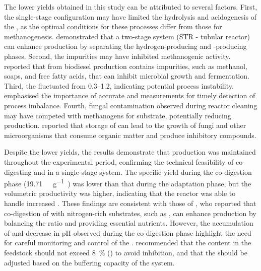 The lower  yields obtained in this study can be attributed to several factors. First, the single-stage configuration may have limited the hydrolysis and acidogenesis of the , as the optimal conditions for these processes differ from those for methanogenesis. \textcite{srimachai2025} demonstrated that a two-stage system (STR - tubular reactor) can enhance  production by separating the hydrogen-producing and -producing phases. Second, the  impurities may have inhibited methanogenic activity. \textcite{anand2012} reported that  from biodiesel production contains impurities, such as methanol, soaps, and free fatty acids, that can inhibit microbial growth and fermentation. Third, the  fluctuated from \numrange{0.3}{1.2}, indicating potential process instability. \textcite{ribas2007} emphasised the importance of accurate  and  measurements for timely detection of process imbalance. Fourth, fungal contamination observed during reactor cleaning may have competed with methanogens for substrate, potentially reducing  production. \textcite{degueurce2020} reported that storage of  can lead to the growth of fungi and other microorganisms that consume organic matter and produce inhibitory compounds.

Despite the lower yields, the results demonstrate that  production was maintained throughout the experimental period, confirming the technical feasibility of co-digesting  and  in a single-stage system. The specific  yield during the co-digestion phase (\qty{19.71}{\nml\CH\per\gram\VSfed}) was lower than that during the adaptation phase, but the volumetric productivity was higher, indicating that the reactor was able to handle increased . These findings are consistent with those of \textcite{gebreegziabher2025}, who reported that co-digestion of  with nitrogen-rich substrates, such as , can enhance  production by balancing the  ratio and providing essential nutrients. However, the accumulation of  and decrease in pH observed during the co-digestion phase highlight the need for careful monitoring and control of the . \textcite{tomczak2025} recommended that the  content in the feedstock should not exceed \qty{8}{\percent} () to avoid inhibition, and that the  should be adjusted based on the buffering capacity of the system.

